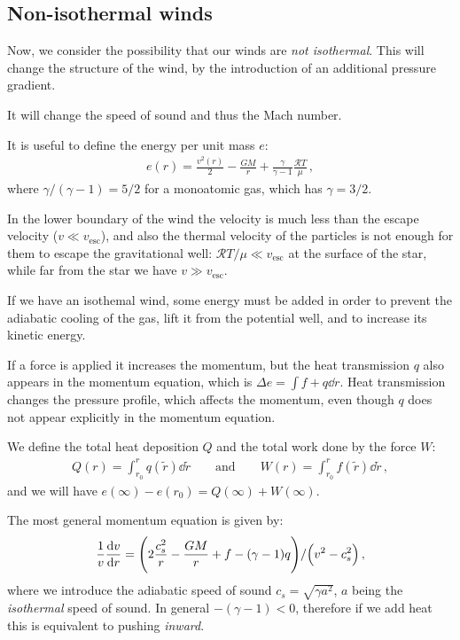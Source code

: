 \documentclass[main.tex]{subfiles}
\begin{document}

\subsection{Non-isothermal winds}

Now, we consider the possibility that our winds are \emph{not isothermal}.
This will change the structure of the wind, by the introduction of an additional pressure gradient.

It will change the speed of sound and thus the Mach number.

It is useful to define the energy per unit mass \(e\): 
%
\begin{align}
  e(r) = \frac{v^2(r)}{2} - \frac{GM}{r} + \frac{\gamma }{\gamma -1} \frac{ \mathcal{R} T}{\mu }
\,,
\end{align}
%
where \(\gamma / (\gamma -1) = 5/2\) for a monoatomic gas, which has \(\gamma = 3/2\).

In the lower boundary of the wind the velocity is much less than the escape velocity (\(v \ll v _{\text{esc}}\)), and also the thermal velocity of the particles is not enough for them to escape the gravitational well: \(\mathcal{R} T / \mu \ll v _{\text{esc}}\) at the surface of the star, while far from the star we have \(v \gg v _{\text{esc}}\).

If we have an isothemal wind, some energy must be added in order to prevent the adiabatic cooling of the gas, lift it from the potential well, and to increase its kinetic energy.

If a force is applied it increases the momentum, but the heat transmission \(q\) also appears in the momentum equation, which is \(\Delta e = \int f + q \dd{r} \).
Heat transmission changes the pressure profile, which affects the momentum, even though \(q\) does not appear explicitly in the momentum equation.

We define the total heat deposition \(Q\) and the total work done by the force \(W\):
%
\begin{align}
Q(r) = \int_{r_0 }^{r} q(\widetilde{r}) \dd{\widetilde{r}}
\qquad \text{and} \qquad
W(r) = \int_{r_0 }^{r} f(\widetilde{r}) \dd{\widetilde{r}}
\,,
\end{align}
%
and we will have \(e( \infty ) - e(r_0 ) = Q( \infty ) + W( \infty )\). 

The most general momentum equation is given by: 
%
\begin{align}
  \frac{1}{v} \dv{v}{r} = \qty(2 \frac{c_s^2}{r} - \frac{GM}{r} + f -(\gamma - 1) q) / \qty(v^2- c_s^2)
\,,
\end{align}
%
where we introduce the adiabatic speed of sound \(c_s = \sqrt{\gamma a^2} \), \(a\) being the \emph{isothermal} speed of sound.
In general \(- (\gamma - 1)<0\), therefore if we add heat this is equivalent to pushing \emph{inward}.
\end{document}
